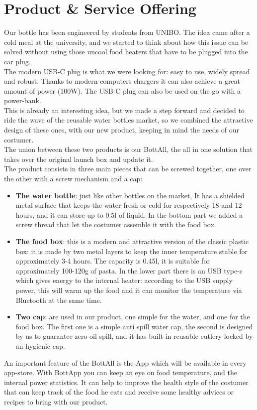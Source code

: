 \section{Product \& Service Offering}
Our bottle has been engineered by students from UNIBO. The idea came after a cold meal at the university, and we started to think about how this issue can be solved without using those uncool food heaters that have to be plugged into the car plug.\\
The modern USB-C plug is what we were looking for: easy to use, widely spread and robust. Thanks to modern computers chargers it can also achieve a great amount of power (100W). The USB-C plug can also be used on the go with a power-bank.\\
This is already an interesting idea, but we made a step forward and decided to ride the wave of the reusable water bottles market, so we combined the attractive design of these ones, with our new product, keeping in mind the needs of our costumer.\\
The union between these two products is our BottAll, the all in one solution that takes over the original launch box and update it.\\
The product consists in three main pieces that can be screwed together, one over the other with a screw mechanism and a cap:
\begin{itemize}
\item \textbf{The water bottle}: just like other bottles on the market, It has a shielded metal surface that keeps the water fresh or cold for respectively 18 and 12 hours, and it can store up to 0.5l of liquid. In the bottom part we added a screw thread that let the costumer assemble it with the food box. 
\item \textbf{The food box}: this is a modern and attractive version of the classic plastic box: it is made by two metal layers to keep the inner temperature stable for approximately 3-4 hours. The capacity is 0.45l, it is suitable for approximately 100-120g of pasta. In the lower part there is an USB type-c which gives energy to the internal heater: according to the USB supply power, this will warm up the food and it can monitor the temperature via Bluetooth at the same time.
\item \textbf{Two cap}: are used in our product, one simple for the water, and one for the food box. The first one is a simple anti spill water cap, the second is designed by us to guarantee zero oil spill, and it has built in reusable cutlery locked by an hygienic cap. 
\end{itemize}
An important feature of the BottAll is the App which will be available in every app-store. With BottApp you can keep an eye on food temperature,
 and the internal power statistics. It can help to improve the health style of the costumer that can keep track of the food he eats and receive some healthy advices or recipes to bring with our product.
